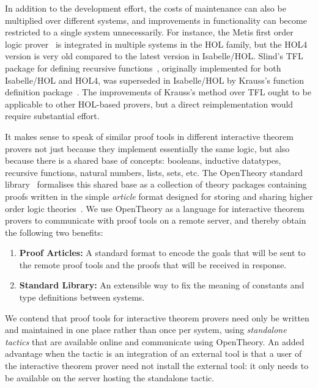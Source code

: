 \documentclass{llncs}
\newcommand{\OpenTheory}{OpenTheory\xspace}
\begin{document}
In addition to the development effort, the costs of maintenance can also be multiplied over different systems, and improvements in functionality can become restricted to a single system unnecessarily.
For instance, the Metis first order logic prover~\cite{hurd2003d} is integrated in multiple systems in the HOL family, but the HOL4 version is very old compared to the latest version in Isabelle/HOL.
Slind's TFL package for defining recursive functions~\cite{slindphd}, originally implemented for both Isabelle/HOL and HOL4, was superseded in Isabelle/HOL by Krauss's function definition package~\cite{DBLP:journals/jar/Krauss10}.
The improvements of Krauss's method over TFL ought to be applicable to other HOL-based provers, but a direct reimplementation would require substantial effort.

It makes sense to speak of similar proof tools in different interactive theorem provers not just because they implement essentially the same logic, but also because there is a shared base of concepts: booleans, inductive datatypes, recursive functions, natural numbers, lists, sets, etc.
The \OpenTheory standard library~\cite{hurd2011} formalises this shared base as a collection of theory packages containing proofs written in the simple \emph{article} format designed for storing and sharing higher order logic theories~\cite{hurd2009}.
We use \OpenTheory as a language for interactive theorem provers to communicate with proof tools on a remote server, and thereby obtain the following two benefits:
\begin{enumerate}
\item\textbf{Proof Articles:} A standard format to encode the goals that will be sent to the remote proof tools and the proofs that will be received in response.

\item\textbf{Standard Library:} An extensible way to fix the meaning of constants and type definitions between systems.
\end{enumerate}

We contend that proof tools for interactive theorem provers need only be written and maintained in one place rather than once per system, using \emph{standalone tactics} that are available online and communicate using \OpenTheory.
An added advantage when the tactic is an integration of an external tool is that a user of the interactive theorem prover need not install the external tool: it only needs to be available on the server hosting the standalone tactic.
\end{document}
